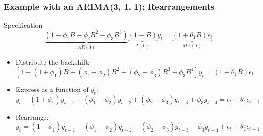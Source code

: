 \documentclass{beamer}
\begin{document}
\begin{frame}
  \frametitle{Example with an ARIMA(3, 1, 1): Rearrangements}

  \begin{block}{Specification}
    \begin{equation*}
      \underbrace{(1 - \phi_1B - \phi_2B^2 - \phi_3B^3)}_{AR(3)}\underbrace{(1-B)}_{I(1)}y_t = \underbrace{(1+\theta_1 B)\epsilon_t}_{MA(1)}
    \end{equation*}
  \end{block}
  
    \begin{itemize}
    \item Distribute the backshift:
      \begin{equation*}
      \left[1 - (1+\phi_1) B + (\phi_1 - \phi_2) B^2 + (\phi_2-\phi_3) B^3 + \phi_3 B^4 \right] y_t = (1+\theta_1 B)\epsilon_t  
      \end{equation*}
      
    \item Express as a function of $y_t$:
      \begin{equation*}
      y_t - (1+\phi_1)y_{t-1} + (\phi_1 - \phi_2)y_{t-2} + (\phi_2 - \phi_3)y_{t-3} + \phi_3 y_{t-4} = \epsilon_t + \theta_1 \epsilon_{t-1}  
      \end{equation*}
    
    \item Rearrange:
      \begin{equation*}
y_t = (1+\phi_1)y_{t-1} - (\phi_1 - \phi_2)y_{t-2} - (\phi_2 - \phi_3)y_{t-3} - \phi_3 y_{t-4} + \epsilon_t + \theta_1 \epsilon_{t-1}        
      \end{equation*}
      
    \end{itemize}  
\end{frame}
\end{document}
